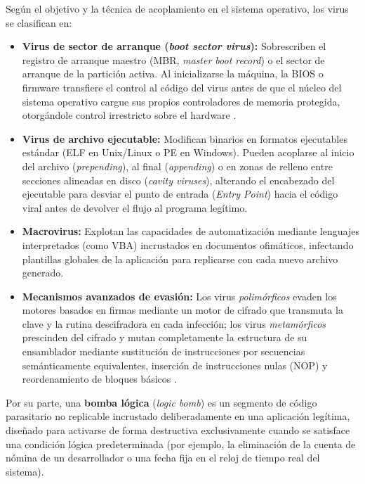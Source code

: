 \documentclass[12pt]{article}
\begin{document}
Según el objetivo y la técnica de acoplamiento en el sistema operativo, los virus se clasifican en:
\begin{itemize}[noitemsep, topsep=2pt]
    \item \textbf{Virus de sector de arranque (\textit{boot sector virus}):} Sobrescriben el registro de arranque maestro (MBR, \textit{master boot record}) o el sector de arranque de la partición activa. Al inicializarse la máquina, la BIOS o firmware transfiere el control al código del virus antes de que el núcleo del sistema operativo cargue sus propios controladores de memoria protegida, otorgándole control irrestricto sobre el hardware \parencite[\S 15.2, p.\ 518]{silberschatz2006fundamentos}.
    \item \textbf{Virus de archivo ejecutable:} Modifican binarios en formatos ejecutables estándar (ELF en Unix/Linux o PE en Windows). Pueden acoplarse al inicio del archivo (\textit{prepending}), al final (\textit{appending}) o en zonas de relleno entre secciones alineadas en disco (\textit{cavity viruses}), alterando el encabezado del ejecutable para desviar el punto de entrada (\textit{Entry Point}) hacia el código viral antes de devolver el flujo al programa legítimo.
    \item \textbf{Macrovirus:} Explotan las capacidades de automatización mediante lenguajes interpretados (como VBA) incrustados en documentos ofimáticos, infectando plantillas globales de la aplicación para replicarse con cada nuevo archivo generado.
    \item \textbf{Mecanismos avanzados de evasión:} Los virus \textit{polimórficos} evaden los motores basados en firmas mediante un motor de cifrado que transmuta la clave y la rutina descifradora en cada infección; los virus \textit{metamórficos} prescinden del cifrado y mutan completamente la estructura de su ensamblador mediante sustitución de instrucciones por secuencias semánticamente equivalentes, inserción de instrucciones nulas (NOP) y reordenamiento de bloques básicos \parencite[\S 19.5.2, p.\ 944]{deitel2004operating}.
\end{itemize}

Por su parte, una \textbf{bomba lógica} (\textit{logic bomb}) es un segmento de código parasitario no replicable incrustado deliberadamente en una aplicación legítima, diseñado para activarse de forma destructiva exclusivamente cuando se satisface una condición lógica predeterminada (por ejemplo, la eliminación de la cuenta de nómina de un desarrollador o una fecha fija en el reloj de tiempo real del sistema).
\end{document}
